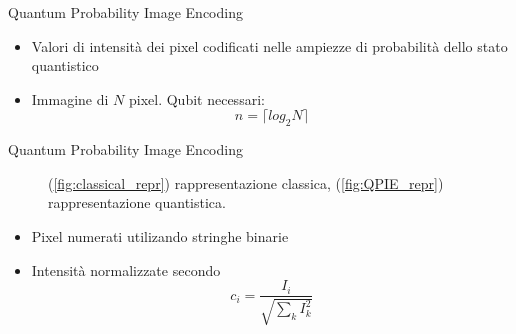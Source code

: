 \documentclass{beamer}
\begin{document}
	\begin{frame}{Quantum Probability Image Encoding}
		\begin{itemize}
			\item Valori di intensità dei pixel codificati nelle ampiezze di
			probabilità dello stato quantistico
			\item Immagine di $N$ pixel. Qubit necessari:
			\[
				n = \lceil{log_2{N}}\rceil
			\]
		\end{itemize}
	\end{frame}

	\begin{frame}{Quantum Probability Image Encoding}
		\begin{figure}
			\centering
			\caption{(\ref{fig:classical_repr}) rappresentazione classica, (\ref{fig:QPIE_repr}) rappresentazione quantistica.}
		\end{figure}

		\begin{itemize}
			\item Pixel numerati utilizando stringhe binarie
			\item Intensità normalizzate secondo
			\[
				c_i = \frac{I_i}{\sqrt{\sum_{k}^{}{I_{k}^2}}}
			\]
		\end{itemize}
	\end{frame}
\end{document}
